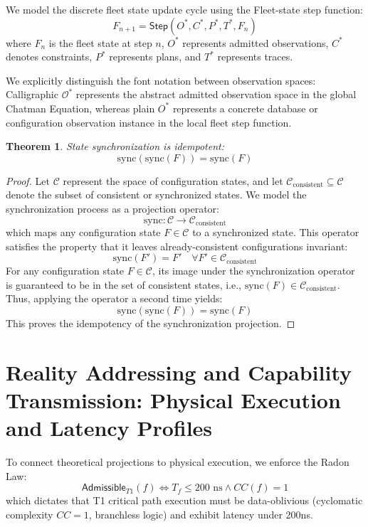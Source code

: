 \documentclass[11pt,a4paper]{article}
\newtheorem{theorem}{Theorem}
\begin{document}
We model the discrete fleet state update cycle using the Fleet-state step function:
\begin{equation}
F_{n+1} = \mathsf{Step}(O^*, C^*, P^*, T^*, F_n)
\end{equation}
where $F_n$ is the fleet state at step $n$, $O^*$ represents admitted observations, $C^*$ denotes constraints, $P^*$ represents plans, and $T^*$ represents traces. 

We explicitly distinguish the font notation between observation spaces: Calligraphic $\mathcal{O}^*$ represents the abstract admitted observation space in the global Chatman Equation, whereas plain $O^*$ represents a concrete database or configuration observation instance in the local fleet step function.

\begin{theorem}
State synchronization is idempotent:
\begin{equation}
\text{sync}(\text{sync}(F)) = \text{sync}(F)
\end{equation}
\end{theorem}
\begin{proof}
Let $\mathcal{C}$ represent the space of configuration states, and let $\mathcal{C}_{\text{consistent}} \subseteq \mathcal{C}$ denote the subset of consistent or synchronized states. We model the synchronization process as a projection operator:
\begin{equation}
\text{sync} : \mathcal{C} \to \mathcal{C}_{\text{consistent}}
\end{equation}
which maps any configuration state $F \in \mathcal{C}$ to a synchronized state. This operator satisfies the property that it leaves already-consistent configurations invariant:
\begin{equation}
\text{sync}(F') = F' \quad \forall F' \in \mathcal{C}_{\text{consistent}}
\end{equation}
For any configuration state $F \in \mathcal{C}$, its image under the synchronization operator is guaranteed to be in the set of consistent states, i.e., $\text{sync}(F) \in \mathcal{C}_{\text{consistent}}$. Thus, applying the operator a second time yields:
\begin{equation}
\text{sync}(\text{sync}(F)) = \text{sync}(F)
\end{equation}
This proves the idempotency of the synchronization projection.
\end{proof}

\section{Reality Addressing and Capability Transmission: Physical Execution and Latency Profiles}
To connect theoretical projections to physical execution, we enforce the Radon Law:
\begin{equation}
\mathsf{Admissible}_{T1}(f) \iff T_f \le 200\text{ ns} \wedge CC(f) = 1
\end{equation}
which dictates that T1 critical path execution must be data-oblivious (cyclomatic complexity $CC = 1$, branchless logic) and exhibit latency under 200ns. 
\end{document}
